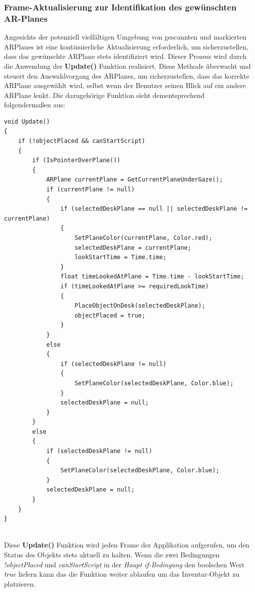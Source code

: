 \subsubsection{Frame-Aktualisierung zur Identifikation des gewünschten AR-Planes}
Angesichts der potenziell vielfältigen Umgebung von gescannten und markierten ARPlanes ist eine kontinuierliche Aktualisierung
erforderlich, um sicherzustellen, dass das gewünschte ARPlane stets identifiziert wird. Dieser Prozess wird durch die
Anwendung der \textbf{Update()} Funktion realisiert. Diese Methode überwacht und steuert den Auswahlvorgang des ARPlanes,
um sicherzustellen, dass das korrekte ARPlane ausgewählt wird, selbst wenn der Benutzer seinen Blick auf ein andere ARPlane
lenkt. Die dazugehörige Funktion sieht dementsprechend folgendermaßen aus:
\begin{lstlisting}[style=csharp, caption={Update Funktion}, label=code:Update]
void Update()
{
    if (!objectPlaced && canStartScript)
    {
        if (IsPointerOverPlane())
        {
            ARPlane currentPlane = GetCurrentPlaneUnderGaze();
            if (currentPlane != null)
            {
                if (selectedDeskPlane == null || selectedDeskPlane != currentPlane)
                {
                    SetPlaneColor(currentPlane, Color.red);
                    selectedDeskPlane = currentPlane;
                    lookStartTime = Time.time;
                }
                float timeLookedAtPlane = Time.time - lookStartTime;
                if (timeLookedAtPlane >= requiredLookTime)
                {
                    PlaceObjectOnDesk(selectedDeskPlane);
                    objectPlaced = true;
                }
            }
            else
            {
                if (selectedDeskPlane != null)
                {
                    SetPlaneColor(selectedDeskPlane, Color.blue);
                }
                selectedDeskPlane = null;
            }
        }
        else
        {
            if (selectedDeskPlane != null)
            {
                SetPlaneColor(selectedDeskPlane, Color.blue);
            }
            selectedDeskPlane = null;
        }
    }
}
\end{lstlisting}\\
Diese \textbf{Update()} Funktion wird jeden Frame der Applikation aufgerufen, um den Status des Objekts stets aktuell zu
halten. Wenn die zwei Bedingungen \textit{!objectPlaced} und \textit{canStartScript} in der \textit{Haupt if-Bedingung}
den boolschen Wert \textit{true} liefern kann das die Funktion weiter ablaufen um das Inventar-Objekt zu platzieren.
